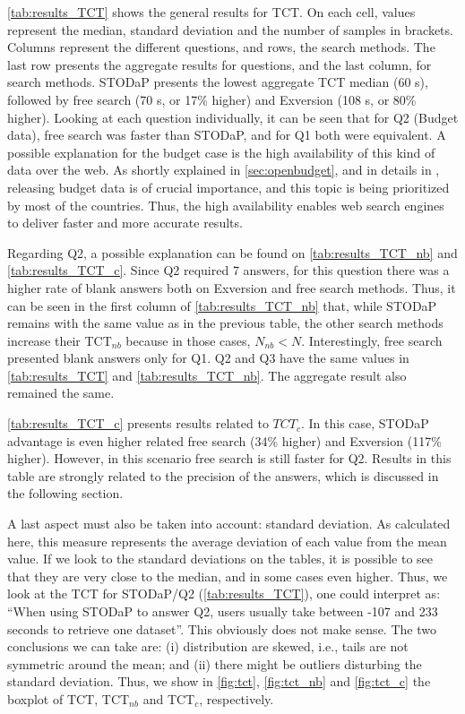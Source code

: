 \autoref{tab:results_TCT} shows the general results for TCT.
On each cell, values represent the median, standard deviation and the number of samples in brackets.
Columns represent the different questions, and rows, the search methods.
The last row presents the aggregate results for questions, and the last column, for search methods.
STODaP presents the lowest aggregate TCT median (60 s), followed by free search (70 s, or 17\% higher) and Exversion (108 s, or 80\% higher).
Looking at each question individually, it can be seen that for Q2 (Budget data), free search was faster than STODaP, and for Q1 both were equivalent.
A possible explanation for the budget case is the high availability of this kind of data over the web.
As shortly explained in \autoref{sec:openbudget}, and in details in , releasing budget data is of crucial importance, and this topic is being prioritized by most of the countries.
Thus, the high availability enables web search engines to deliver faster and more accurate results.

Regarding Q2, a possible explanation can be found on \autoref{tab:results_TCT_nb} and \autoref{tab:results_TCT_c}.
Since Q2 required 7 answers, for this question there was a higher rate of blank answers both on Exversion and free search methods.
Thus, it can be seen in the first column of \autoref{tab:results_TCT_nb} that, while STODaP remains with the same value as in the previous table, the other search methods increase their TCT$_{nb}$ because in those cases, $N_{nb} < N$.
Interestingly, free search presented blank answers only for Q1.
Q2 and Q3 have the same values in \autoref{tab:results_TCT} and \autoref{tab:results_TCT_nb}.
The aggregate result also remained the same.

\autoref{tab:results_TCT_c} presents results related to $TCT_c$.
In this case, STODaP advantage is even higher related free search (34\% higher) and Exversion (117\% higher).
However, in this scenario free search is still faster for Q2.
Results in this table are strongly related to the precision of the answers, which is discussed in the following section.

A last aspect must also be taken into account: standard deviation.
As calculated here, this measure represents the average deviation of each value from the mean value.
If we look to the standard deviations on the tables, it is possible to see that they are very close to the median, and in some cases even higher.
Thus, we look at the TCT for STODaP/Q2 (\autoref{tab:results_TCT}), one could interpret as: ``When using STODaP to answer Q2, users usually take between -107 and 233 seconds to retrieve one dataset''.
This obviously does not make sense.
The two conclusions we can take are: (i) distribution are skewed, i.e., tails are not symmetric around the mean; and (ii) there might be outliers disturbing the standard deviation.
Thus, we show in \autoref{fig:tct}, \autoref{fig:tct_nb} and \autoref{fig:tct_c} the boxplot of TCT, TCT$_{nb}$ and TCT$_c$, respectively.

